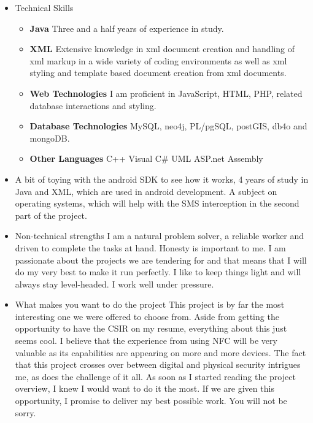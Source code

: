 \documentclass[12pt, oneside]{article}
\begin{document}
\begin{enumerate}
\begin{itemize}
							\item Technical Skills\newline
								\begin{itemize}
								\item {\bf Java}\newline
									Three and a half years of experience in study.
								\item {\bf XML}\newline
									Extensive knowledge in xml document creation and handling of xml markup in a wide variety of coding environments as well as xml styling and template based document creation from xml documents.
								\item {\bf Web Technologies}\newline
									I am proficient in JavaScript, HTML, PHP, related database interactions and styling.
								\item {\bf Database Technologies}\newline
								MySQL, neo4j, PL/pgSQL, postGIS, db4o and mongoDB.
								\item {\bf Other Languages}\newline
									C++\newline
									Visual C\#\newline
									UML\newline	
									ASP.net\newline
									Assembly\newline
								\end{itemize}
							\item A bit of toying with the android SDK to see how it works, 4 years of study in Java and XML, which are used in android development. A subject on operating systems, which will help with the SMS interception in the second part of the project.
							\item Non-technical strengths\newline
								I am a natural problem solver, a reliable worker and driven to complete the tasks at hand. Honesty is important to me. I am passionate about the projects we are tendering for and that means that I will do my very best to make it run perfectly. I like to keep things light and will always stay level-headed. I work well under pressure.
							\item What makes you want to do the project\newline
								This project is by far the most interesting one we were offered to choose from. Aside from getting the opportunity to have the CSIR on my resume, everything about this just seems cool. I believe that the experience from using NFC will be very valuable as its capabilities are appearing on more and more devices. The fact that this project crosses over between digital and physical security intrigues me, as does the challenge of it all. As soon as I started reading the project overview, I knew I would want to do it the most. If we are given this opportunity, I promise to deliver my best possible work. You will not be sorry.

\end{itemize}
\end{enumerate}
\end{document}
